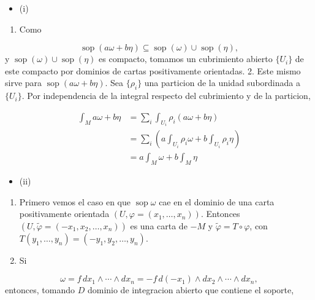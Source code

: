 \begin{bookproof}{}
\begin{itemize}
\item (i)
\end{itemize}
\begin{enumerate}
\item Como
\end{enumerate}
\[
\operatorname{sop}(a\omega+b\eta)\subseteq\operatorname{sop}(\omega)\cup\operatorname{sop}(\eta),
\]
y $\operatorname{sop}(\omega)\cup\operatorname{sop}(\eta)$ es compacto, tomamos un cubrimiento abierto $\{U_i\}$ de este compacto por dominios de cartas positivamente orientadas. 2. Este mismo sirve para $\operatorname{sop}(a\omega+b\eta)$. Sea $\{\rho_i\}$ una particion de la unidad subordinada a $\{U_i\}$. Por independencia de la integral respecto del cubrimiento y de la particion,

\[
\begin{aligned} \int_Ma\omega+b\eta& =\sum_i\int_{U_i}\rho_i(a\omega+b\eta)\\&=\sum_i\left(a\int_{U_i}\rho_i\omega+b\int_{U_i}\rho_i\eta\right)\\&=a\int_M\omega+b\int_M\eta\end{aligned}
\]
\begin{itemize}
\item (ii)
\end{itemize}
\begin{enumerate}
\item Primero vemos el caso en que $\operatorname{sop}\omega$ cae en el dominio de una carta positivamente orientada $(U,\varphi=(x_1,\ldots,x_n))$. Entonces $(U,\widetilde\varphi=(-x_1,x_2,\ldots,x_n))$ es una carta de $-M$ y $\widetilde\varphi=T\circ\varphi$, con $T(y_1,\ldots,y_n)=(-y_1,y_2,\ldots,y_n)$.
\item Si
\end{enumerate}
\[
\omega=f\,dx_1\wedge\cdots\wedge dx_n=-f\,d(-x_1)\wedge dx_2\wedge\cdots\wedge dx_n,
\]
entonces, tomando $D$ dominio de integracion abierto que contiene el soporte,


\end{bookproof}
